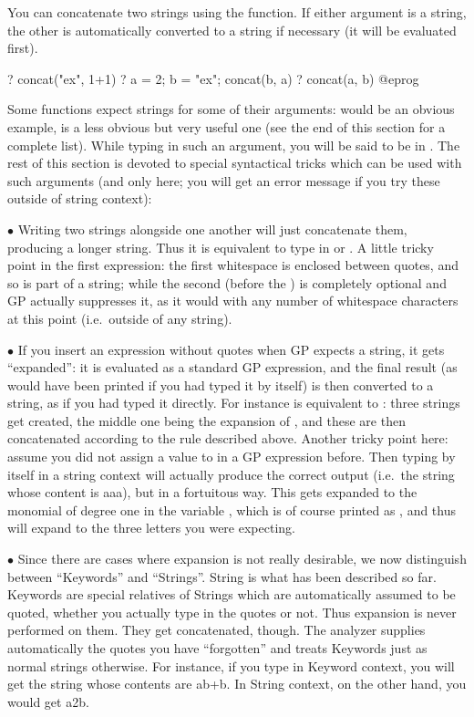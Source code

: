 You can concatenate two strings using the  function. If either
argument is a string, the other is automatically converted to a string if
necessary (it will be evaluated first).

\bprog
? concat("ex", 1+1)
? a = 2; b = "ex"; concat(b, a)
? concat(a, b)
@eprog

Some functions expect strings for some of their arguments:  would
be an obvious example,  is a less obvious but very useful one (see
the end of this section for a complete list). While typing in such an
argument, you will be said to be in . The rest of
this section is devoted to special syntactical tricks which can be used with
such arguments (and only here; you will get an error message if you try these
outside of string context):

$\bullet$ Writing two strings alongside one another will just concatenate
them, producing a longer string. Thus it is equivalent to type in
 or . A little tricky point in the first expression:
the first whitespace is enclosed between quotes, and so is part of a string;
while the second (before the ) is completely optional and GP
actually suppresses it, as it would with any number of whitespace characters
at this point (i.e.~outside of any string).

$\bullet$ If you insert an expression without quotes when GP expects a
string, it gets ``expanded'': it is evaluated as a standard GP expression,
and the final result (as would have been printed if you had typed it by
itself) is then converted to a string, as if you had typed it directly. For
instance  is equivalent to : three strings get
created, the middle one being the expansion of , and these are then
concatenated according to the rule described above. Another tricky point
here: assume you did not assign a value to  in a GP expression
before. Then typing  by itself in a string context will actually
produce the correct output (i.e.~the string whose content is aaa), but in a
fortuitous way. This  gets expanded to the monomial of degree one in
the variable , which is of course printed as , and thus
will expand to the three letters you were expecting.

$\bullet$ Since there are cases where expansion is not really desirable, we
now distinguish between ``Keywords'' and ``Strings''. String is what has been
described so far. Keywords are special relatives of Strings which are
automatically assumed to be quoted, whether you actually type in the quotes
or not. Thus expansion is never performed on them. They get concatenated,
though. The analyzer supplies automatically the quotes you have ``forgotten''
and treats Keywords just as normal strings otherwise. For instance, if you
type  in Keyword context, you will get the string whose contents
are ab+b. In String context, on the other hand, you would get a2\kbd{*}b.

